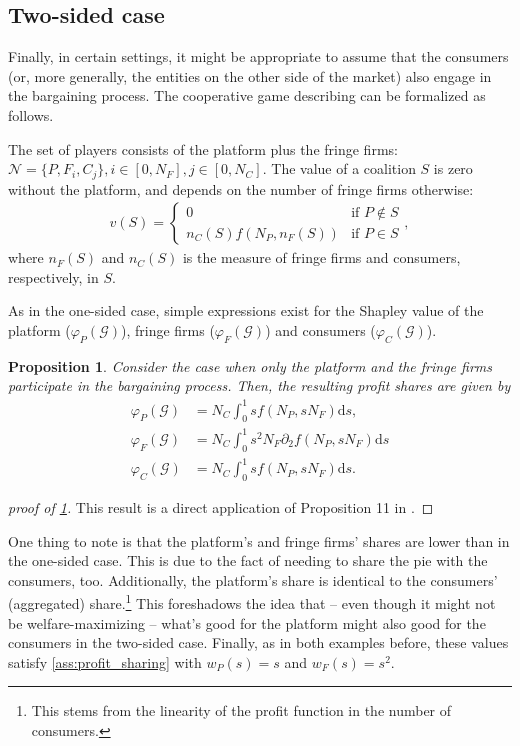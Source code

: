 \documentclass[a4paper]{article}
\newtheorem{proposition}{Proposition}
\newcommand{\ds}{\mathrm{d}s}
\begin{document}
\subsection{Two-sided case}
\label{sec:cooperative_game_two_sided}

Finally, in certain settings, it might be appropriate to assume that the consumers (or, more generally, the entities on the other side of the market) also engage in the bargaining process.
The cooperative game describing can be formalized as follows.

The set of players consists of the platform plus the fringe firms: $\mathcal{N} = \{P, F_i, C_j\}, i \in [0, N_F], j \in [0, N_C]$.
The value of a coalition $S$ is zero without the platform, and depends on the number of fringe firms otherwise:
\begin{align*}
    v(S) = \begin{cases}
        0 & \text{if } P \notin S \\
        n_C(S) f(N_P, n_F(S)) & \text{if } P \in S
    \end{cases},
\end{align*}
where $n_F(S)$ and $n_C(S)$ is the measure of fringe firms and consumers, respectively, in $S$.

As in the one-sided case, simple expressions exist for the Shapley value of the platform ($\varphi_P(\mathcal{G})$), fringe firms ($\varphi_F(\mathcal{G})$) and consumers ($\varphi_C(\mathcal{G})$).

\begin{proposition}
    \label{prop:profit_sharing_two_sided}
    Consider the case when only the platform and the fringe firms participate in the bargaining process.
    Then, the resulting profit shares are given by
    \begin{align*}
        \varphi_P(\mathcal{G}) &= N_C \int_0^1 s f(N_P, s N_F) \ds, \\
        \varphi_F(\mathcal{G}) &= N_C \int_0^1 s^2 N_F \partial_2 f(N_P, s N_F) \ds \\
        \varphi_C(\mathcal{G}) &= N_C \int_0^1 s f(N_P, s N_F) \ds.
    \end{align*}
\end{proposition}
\begin{proof}[proof of \cref{prop:profit_sharing_two_sided}]
    This result is a direct application of Proposition 11 in \textcite{stancsics2023value}.
\end{proof}

One thing to note is that the platform's and fringe firms' shares are lower than in the one-sided case.
This is due to the fact of needing to share the pie with the consumers, too.
Additionally, the platform's share is identical to the consumers' (aggregated) share.\footnote{
    This stems from the linearity of the profit function in the number of consumers.
}
This foreshadows the idea that -- even though it might not be welfare-maximizing -- what's good for the platform might also good for the consumers in the two-sided case.
Finally, as in both examples before, these values satisfy \cref{ass:profit_sharing} with $w_P(s) = s$ and $w_F(s) = s^2$.
\end{document}
